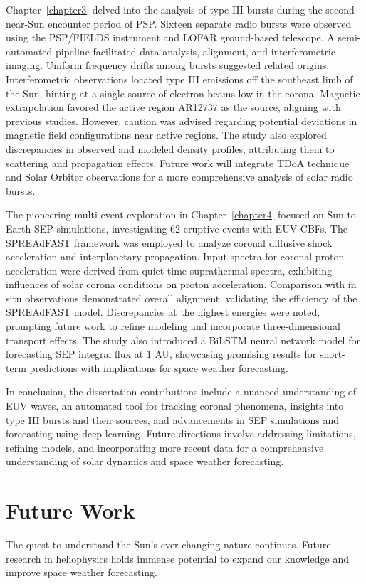 Chapter~\ref{chapter3} delved into the analysis of type III bursts during the second near-Sun encounter period of PSP. Sixteen separate radio bursts were observed using the PSP/FIELDS instrument and LOFAR ground-based telescope. A semi-automated pipeline facilitated data analysis, alignment, and interferometric imaging. Uniform frequency drifts among bursts suggested related origins. Interferometric observations located type III emissions off the southeast limb of the Sun, hinting at a single source of electron beams low in the corona. Magnetic extrapolation favored the active region AR12737 as the source, aligning with previous studies. However, caution was advised regarding potential deviations in magnetic field configurations near active regions. The study also explored discrepancies in observed and modeled density profiles, attributing them to scattering and propagation effects. Future work will integrate TDoA technique and Solar Orbiter observations for a more comprehensive analysis of solar radio bursts.

The pioneering multi-event exploration in Chapter~\ref{chapter4} focused on Sun-to-Earth SEP simulations, investigating 62 eruptive events with EUV CBFs. The SPREAdFAST framework was employed to analyze coronal diffusive shock acceleration and interplanetary propagation. Input spectra for coronal proton acceleration were derived from quiet-time suprathermal spectra, exhibiting influences of solar corona conditions on proton acceleration. Comparison with in situ observations demonstrated overall alignment, validating the efficiency of the SPREAdFAST model. Discrepancies at the highest energies were noted, prompting future work to refine modeling and incorporate three-dimensional transport effects. The study also introduced a BiLSTM neural network model for forecasting SEP integral flux at 1 AU, showcasing promising results for short-term predictions with implications for space weather forecasting.

In conclusion, the dissertation contributions include a nuanced understanding of EUV waves, an automated tool for tracking coronal phenomena, insights into type III bursts and their sources, and advancements in SEP simulations and forecasting using deep learning. Future directions involve addressing limitations, refining models, and incorporating more recent data for a comprehensive understanding of solar dynamics and space weather forecasting.

\section{Future Work}
The quest to understand the Sun's ever-changing nature continues. Future research in heliophysics holds immense potential to expand our knowledge and improve space weather forecasting.

